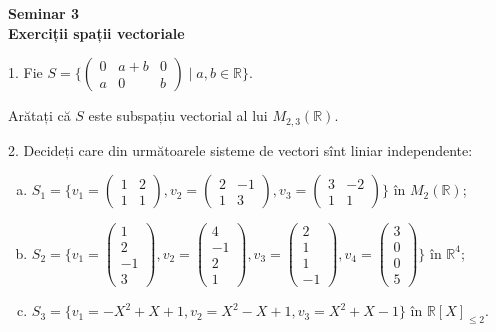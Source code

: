 \documentclass[11pt,a4paper]{article}
\newcommand\RR{\mathbb{R}}
\theoremstyle{dotless}
\theoremstyle{dotlessdr}
\begin{document}

\begin{center}
  {\large\textbf{Seminar 3 \\ Exerciții spații vectoriale}}
\end{center}

\vspace{1cm}

1. Fie $S = \Bigg\{ \begin{pmatrix}
  0 & a + b & 0 \\
  a & 0 & b
\end{pmatrix} \mid a, b \in \RR \Bigg\}$.

Arătați că $S$ este subspațiu vectorial al lui $M_{2,3}(\RR)$.

\vspace{1cm}

2. Decideți care din următoarele sisteme de vectori sînt liniar independente:
\begin{enumerate}[(a)]
\item $S_1 = \Bigg\{ v_1 = \begin{pmatrix} 1 & 2 \\ 1 & 1 \end{pmatrix}, %
  v_2 = \begin{pmatrix} 2 & -1 \\ 1 & 3 \end{pmatrix}, %
  v_3 = \begin{pmatrix} 3 & -2 \\ 1 & 1 \end{pmatrix} \Bigg\}$ în $M_2(\RR)$;
\item $S_2 = \Bigg\{ v_1 = \begin{pmatrix} 1 \\ 2 \\ -1 \\ 3 \end{pmatrix}, %
  v_2 = \begin{pmatrix} 4 \\ -1 \\ 2 \\ 1 \end{pmatrix}, %
  v_3 = \begin{pmatrix} 2 \\ 1 \\ 1 \\ -1 \end{pmatrix}, %
  v_4 = \begin{pmatrix} 3 \\ 0 \\ 0 \\ 5 \end{pmatrix} \Bigg\}$ în $\RR^4$;
\item $S_3 = \{ v_1 = -X^2 + X + 1, v_2 = X^2 - X + 1, v_3 = X^2 + X - 1 \}$ în $\RR[X]_{\leq 2}$.
\end{enumerate}
\end{document}
